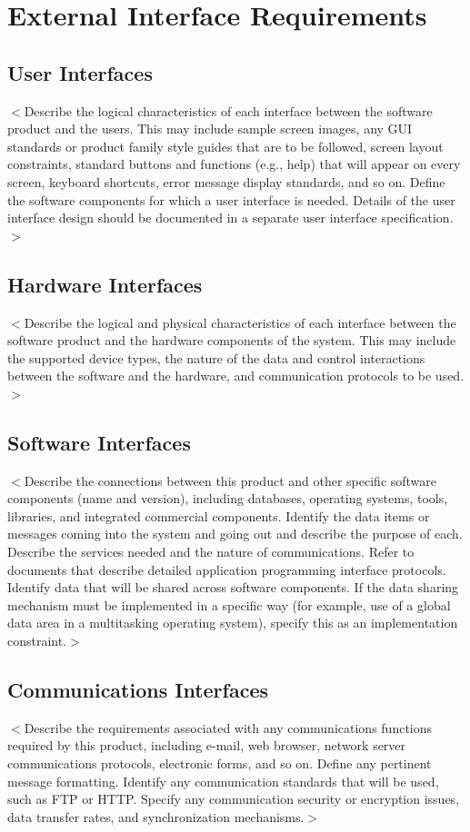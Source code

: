 \documentclass{scrreprt}
\begin{document}
\chapter{External Interface Requirements}

\section{User Interfaces}
$<$Describe the logical characteristics of each interface between the software 
product and the users. This may include sample screen images, any GUI standards 
or product family style guides that are to be followed, screen layout 
constraints, standard buttons and functions (e.g., help) that will appear on 
every screen, keyboard shortcuts, error message display standards, and so on.  
Define the software components for which a user interface is needed. Details of 
the user interface design should be documented in a separate user interface 
specification.$>$

\section{Hardware Interfaces}
$<$Describe the logical and physical characteristics of each interface between 
the software product and the hardware components of the system. This may include 
the supported device types, the nature of the data and control interactions 
between the software and the hardware, and communication protocols to be 
used.$>$

\section{Software Interfaces}
$<$Describe the connections between this product and other specific software 
components (name and version), including databases, operating systems, tools, 
libraries, and integrated commercial components. Identify the data items or 
messages coming into the system and going out and describe the purpose of each.  
Describe the services needed and the nature of communications. Refer to 
documents that describe detailed application programming interface protocols.  
Identify data that will be shared across software components. If the data 
sharing mechanism must be implemented in a specific way (for example, use of a 
global data area in a multitasking operating system), specify this as an 
implementation constraint.$>$

\section{Communications Interfaces}
$<$Describe the requirements associated with any communications functions 
required by this product, including e-mail, web browser, network server 
communications protocols, electronic forms, and so on. Define any pertinent 
message formatting. Identify any communication standards that will be used, such 
as FTP or HTTP. Specify any communication security or encryption issues, data 
transfer rates, and synchronization mechanisms.$>$
\end{document}
